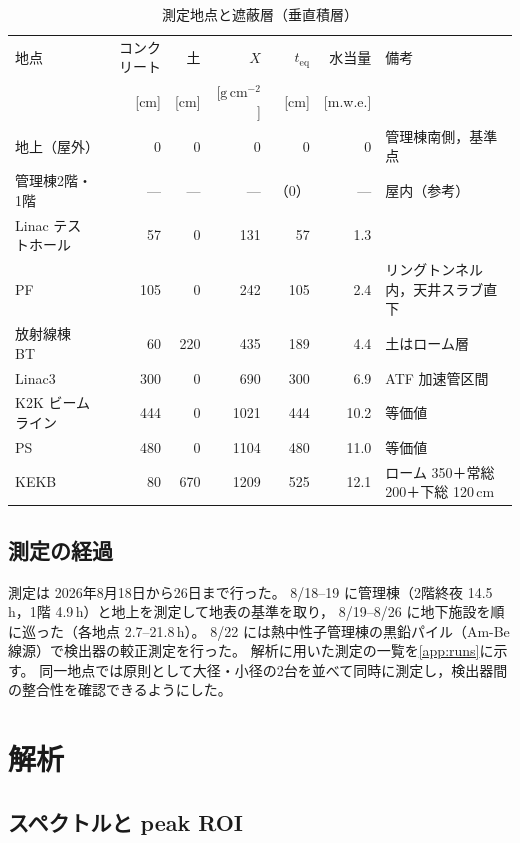 \documentclass[a4paper,11pt]{ltjsarticle}
\newcommand{\teq}{t_{\mathrm{eq}}}
\newcommand{\gcm}{\mathrm{g\,cm^{-2}}}
\begin{document}
\begin{table}[htbp]
  \centering
  \caption{測定地点と遮蔽層（垂直積層）}
  \label{tab:sites}
  \footnotesize
  \begin{tabular}{lrrrrrl}
    \toprule
    地点 & コンクリート & 土 & $X$ & $\teq$ & 水当量 & 備考 \\
         & [cm] & [cm] & [$\gcm$] & [cm] & [m.w.e.] & \\
    \midrule
    地上（屋外） & 0 & 0 & 0 & 0 & 0 & 管理棟南側，基準点 \\
    管理棟2階・1階 & --- & --- & --- & （0） & --- & 屋内（参考） \\
    Linac テストホール & 57 & 0 & 131 & 57 & 1.3 & \\
    PF & 105 & 0 & 242 & 105 & 2.4 & リングトンネル内，天井スラブ直下 \\
    放射線棟 BT & 60 & 220 & 435 & 189 & 4.4 & 土はローム層 \\
    Linac3 & 300 & 0 & 690 & 300 & 6.9 & ATF 加速管区間 \\
    K2K ビームライン & 444 & 0 & 1021 & 444 & 10.2 & 等価値 \\
    PS & 480 & 0 & 1104 & 480 & 11.0 & 等価値 \\
    KEKB & 80 & 670 & 1209 & 525 & 12.1 & ローム 350＋常総 200＋下総 120\,cm \\
    \bottomrule
  \end{tabular}
\end{table}

\subsection{測定の経過}

測定は 2026年8月18日から26日まで行った。
8/18--19 に管理棟（2階終夜 14.5\,h，1階 4.9\,h）と地上を測定して地表の基準を取り，
8/19--8/26 に地下施設を順に巡った（各地点 2.7--21.8\,h）。
8/22 には熱中性子管理棟の黒鉛パイル（Am-Be 線源）で検出器の較正測定を行った。
解析に用いた測定の一覧を\ref{app:runs}に示す。
同一地点では原則として大径・小径の2台を並べて同時に測定し，検出器間の整合性を確認できるようにした。

\section{解析}

\subsection{スペクトルと peak ROI}
\end{document}

